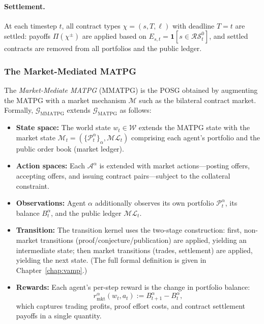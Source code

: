 \paragraph{Settlement.}
At each timestep $t$, all contract types $\chi = (s,T,\ell)$ with deadline $T = t$ are settled: payoffs $\Pi(\chi^\pm)$ are applied based on $E_{s,t} = \mathbf{1}[s\in\mathcal{RS}^0_t]$, and settled contracts are removed from all portfolios and the public ledger.


\subsubsection{The Market-Mediated MATPG}\label{sec:market-matpg-def}

\begin{definition}\label{def:vamp-game}
The \emph{Market-Mediate MATPG} (MMATPG) is the POSG obtained by augmenting the MATPG with a market mechanism $\mathscr{M}$ such as the bilateral contract market. Formally, $\mathcal{G}_{\mathrm{MMATPG}}$ extends $\mathcal{G}_{\mathrm{MATPG}}$ as follows:
\begin{itemize}
    \item \textbf{State space:} The world state $w_t\in\mathcal{W}$ extends the MATPG state with the market state $\mathcal{M}_t = (\{\mathcal{P}^\alpha_t\}_\alpha,\mathcal{ML}_t)$ comprising each agent's portfolio and the public order book (market ledger).
    
    \item \textbf{Action spaces:} Each $\mathcal{A}^\alpha$ is extended with market actions---posting offers, accepting offers, and issuing contract pairs---subject to the collateral constraint.
    
    \item \textbf{Observations:} Agent $\alpha$ additionally observes its own portfolio $\mathcal{P}^\alpha_t$, its balance $B^\alpha_t$, and the public ledger $\mathcal{ML}_t$.
    
    \item \textbf{Transition:} The transition kernel uses the two-stage construction: first, non-market transitions (proof/conjecture/publication) are applied, yielding an intermediate state; then market transitions (trades, settlement) are applied, yielding the next state. (The full formal definition is given in Chapter~\ref{chap:vamp}.)
    
    \item \textbf{Rewards:} Each agent's per-step reward is the change in portfolio balance:
    \[
    r^\alpha_{\mathrm{mkt}}(w_t,a_t) := B^\alpha_{t+1} - B^\alpha_t,
    \]
    which captures trading profits, proof effort costs, and contract settlement payoffs in a single quantity.
\end{itemize}
\end{definition}

